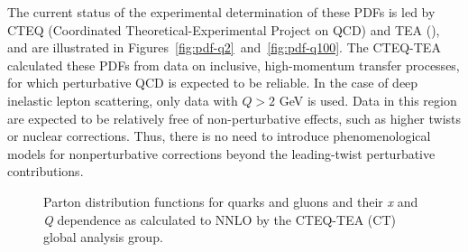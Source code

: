 The current status of the experimental determination of these PDFs is led by CTEQ (Coordinated Theoretical-Experimental Project on QCD) and TEA (), and are illustrated in Figures~\ref{fig:pdf-q2}~and~\ref{fig:pdf-q100}. The CTEQ-TEA calculated these PDFs from data on inclusive, high-momentum transfer processes, for which perturbative QCD is expected to be reliable. In the case of deep inelastic lepton scattering, only data with $Q > 2$ GeV is used. Data in this region are expected to be relatively free of non-perturbative effects, such as higher twists or nuclear corrections. Thus, there is no need to introduce phenomenological models for nonperturbative corrections beyond the leading-twist perturbative contributions\cite{Dulat:2015mca}.

\begin{figure}
	\centering
	\hspace{8pt}%
	\caption{Parton distribution functions for quarks and gluons and their \emph{x} and \emph{Q} dependence as calculated to NNLO by the CTEQ-TEA (CT) global analysis group\cite{Dulat:2015mca}.}
	\label{fig:pdf-q2-q100}
\end{figure}

